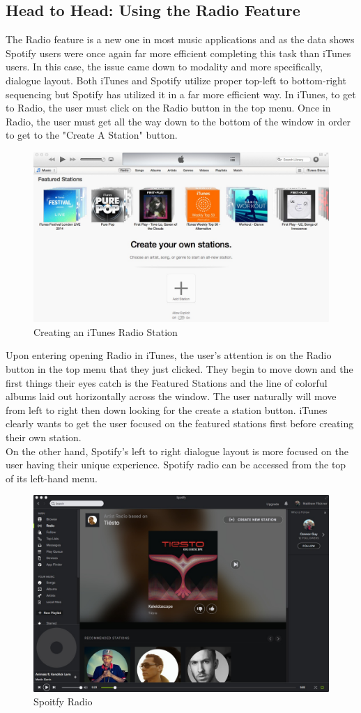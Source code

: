 \documentclass[a4paper]{article}
\begin{document}
\subsection{Head to Head: Using the Radio Feature}
The Radio feature is a new one in most music applications and as the data shows Spotify users were once again far more efficient completing this task than iTunes users. In this case, the issue came down to modality and more specifically, dialogue layout. Both iTunes and Spotify utilize proper top-left to bottom-right sequencing but Spotify has utilized it in a far more efficient way. In iTunes, to get to Radio, the user must click on the Radio button in the top menu. Once in Radio, the user must get all the way down to the bottom of the window in order to get to the "Create A Station" button.

\begin{figure}[H]
\centering
\includegraphics[width=.6\textwidth]{itunesradio.jpg}
\caption{\label{heuristic: iTunesRadio} Creating an iTunes Radio Station}
\end{figure}

Upon entering opening Radio in iTunes, the user's attention is on the Radio button in the top menu that they just clicked. They begin to move down and the first things their eyes catch is the Featured Stations and the line of colorful albums laid out horizontally across the window. The user naturally will move from left to right then down looking for the create a station button. iTunes clearly wants to get the user focused on the featured stations first before creating their own station.\\

On the other hand, Spotify's left to right dialogue layout is more focused on the user having their unique experience. Spotify radio can be accessed from the top of its left-hand menu.

\begin{figure}[H]
\centering
\includegraphics[width=.6\textwidth]{spotifyradio.jpg}
\caption{\label{heuristic: spotifyRadio} Spoitfy Radio}
\end{figure}
\end{document}
